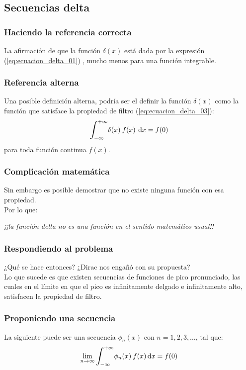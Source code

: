\documentclass[12pt]{beamer}
\begin{document}
\subsection{Secuencias delta}\label{secuencias_delta}

\begin{frame}
\frametitle{Haciendo la referencia correcta}
La afirmación de que la función $\delta (x)$ está dada por la expresión (\ref{eq:ecuacion_delta_01}) \textit{}, mucho menos para una función integrable.
\end{frame}

\begin{frame}
\frametitle{Referencia alterna}
Una posible definición alterna, podría ser el definir la función $\delta (x)$ como la función que satisface la propiedad de filtro (\ref{eq:ecuacion_delta_03}):
\pause
\begin{align*}
\scaleint{6ex}_{\bs -\infty}^{+ \infty} \delta (x) \: f (x) \: \dd{x} = f (0)
\end{align*}
para toda función continua $f (x)$. 
\end{frame}

\begin{frame}
\frametitle{Complicación matemática}
Sin embargo es posible demostrar que no existe ninguna función con esa propiedad.
\\
\bigskip
\pause
Por lo que:
\pause
\begin{center}
\textit{¡¡la función delta no es una función en el sentido matemático usual!!}
\end{center}
\end{frame}

\begin{frame}
\frametitle{Respondiendo al problema}
¿Qué se hace entonces? \pause ¿Dirac nos engañó con su propuesta?
\\
\bigskip
\pause
Lo que sucede es que existen secuencias de funciones de pico pronunciado, las cuales en el límite en que el pico es infinitamente delgado e infinitamente alto, satisfacen la propiedad de filtro.
\end{frame}

\begin{frame}
\frametitle{Proponiendo una secuencia}
La siguiente puede ser una secuencia $\phi_{n} (x)$ con $n = 1, 2, 3, \ldots$, tal que:
\pause
\begin{align*}
\lim_{n \to \infty} \scaleint{6ex}_{\bs -\infty}^{+ \infty} \phi_{n} (x) \: f (x) \dd{x} =  f (0)
\end{align*}
\end{frame}
\end{document}
